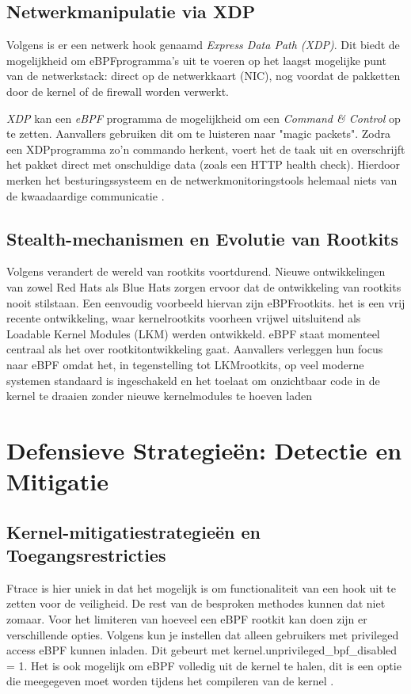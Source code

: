 \subsection{Netwerkmanipulatie via XDP}
Volgens \textcite{zacharia-mansouri-2026-NReUKT} is er een netwerk hook genaamd \emph{Express Data Path (XDP)}. Dit biedt de mogelijkheid om eBPF\-programma's uit te voeren op het laagst mogelijke punt van de netwerkstack: direct op de netwerkkaart (NIC), nog voordat de pakketten door de kernel of de firewall worden verwerkt.  

\emph{XDP} kan een \emph{eBPF} programma de mogelijkheid om een \emph{Command \& Control} op te zetten. Aanvallers gebruiken dit om te luisteren naar "magic packets". Zodra een XDP\-programma zo'n commando herkent, voert het de taak uit en overschrijft het pakket direct met onschuldige data (zoals een HTTP health check). Hierdoor merken het besturingssysteem en de netwerkmonitoringstools helemaal niets van de kwaadaardige communicatie \autocite{zacharia-mansouri-2026-NReUKT}. 

\subsection{Stealth-mechanismen en Evolutie van Rootkits}
Volgens \textcite{Heredia2021} verandert de wereld van rootkits voortdurend. Nieuwe ontwikkelingen van zowel Red Hats als Blue Hats zorgen ervoor dat de ontwikkeling van rootkits nooit stilstaan. Een eenvoudig voorbeeld hiervan zijn eBPF\-rootkits. het is een vrij recente ontwikkeling, waar kernel\-rootkits voorheen vrijwel uitsluitend als Loadable Kernel Modules (LKM) werden ontwikkeld. eBPF staat momenteel centraal als het over rootkit\-ontwikkeling gaat. Aanvallers verleggen hun focus naar eBPF omdat het, in tegenstelling tot LKM\-rootkits, op veel moderne systemen standaard is ingeschakeld en het toelaat om onzichtbaar code in de kernel te draaien zonder nieuwe kernelmodules te hoeven laden \autocite{Heredia2021}

\section{Defensieve Strategieën: Detectie en Mitigatie}
\subsection{Kernel-mitigatiestrategieën en Toegangsrestricties}
Ftrace is hier uniek in dat het mogelijk is om functionaliteit van een hook uit te zetten voor de veiligheid. De rest van de besproken methodes kunnen dat niet zomaar. Voor het limiteren van hoeveel een eBPF rootkit kan doen zijn er verschillende opties. Volgens \textcite{Instatunnel2023} kun je instellen dat alleen gebruikers met privileged access eBPF kunnen inladen. Dit gebeurt met kernel.unprivileged\_bpf\_disabled = 1. Het is ook mogelijk om eBPF volledig uit de kernel te halen, dit is een optie die meegegeven moet worden tijdens het compileren van de kernel \autocite{Windshock2025}.


